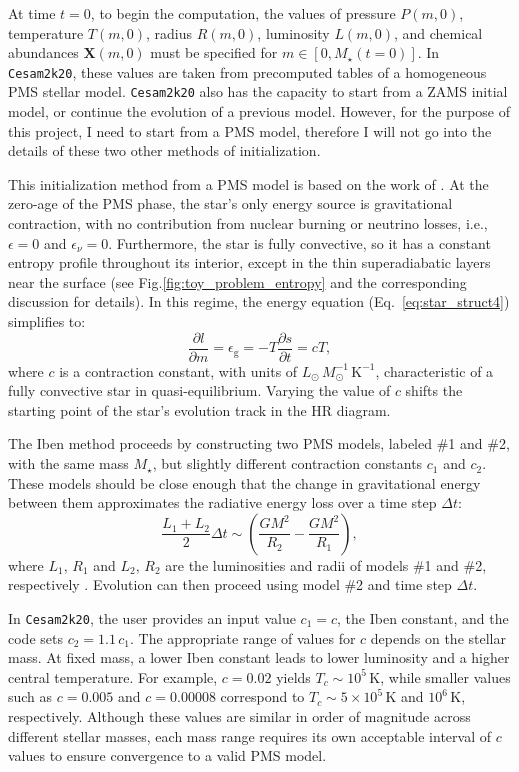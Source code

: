 \documentclass[12pt,a4paper]{article}
\newcommand{\mr}{\mathrm}
\newcommand{\pfird}[2][]{\frac{\partial#1}{\partial#2}}
\newcommand{\bvec}[1]{\boldsymbol{#1}}
\begin{document}
At time $t = 0$, to begin the computation, the values of pressure $P(m, 0)$, temperature $T(m, 0)$, radius $R(m, 0)$, luminosity $L(m, 0)$, and chemical abundances $\bvec{X}(m, 0)$ must be specified for $m \in [0, M_\star(t=0)]$. In \texttt{Cesam2k20}, these values are taken from precomputed tables of a homogeneous PMS stellar model. \texttt{Cesam2k20} also has the capacity to start from a ZAMS initial model, or continue the evolution of a previous model. However, for the purpose of this project, I need to start from a PMS model, therefore I will not go into the details of these two other methods of initialization. 

This initialization method from a PMS model is based on the work of \textcite{Iben1965a}. At the zero-age of the PMS phase, the star's only energy source is gravitational contraction, with no contribution from nuclear burning or neutrino losses, i.e., $\epsilon = 0$ and $\epsilon_\nu = 0$. Furthermore, the star is fully convective, so it has a constant entropy profile throughout its interior, except in the thin superadiabatic layers near the surface (see Fig.\ref{fig:toy_problem_entropy} and the corresponding discussion for details). In this regime, the energy equation (Eq.~\eqref{eq:star_struct4}) simplifies to:
\begin{equation}
  \pfird[l]{m} = \epsilon_\mr{g} = -T\pfird[s]{t} = cT,
\end{equation}
where $c$ is a contraction constant, with units of $L_\odot\,M_\odot^{-1}\,\mr{K}^{-1}$, characteristic of a fully convective star in quasi-equilibrium. Varying the value of $c$ shifts the starting point of the star's evolution track in the HR diagram.

The Iben method proceeds by constructing two PMS models, labeled \#1 and \#2, with the same mass $M_\star$, but slightly different contraction constants $c_1$ and $c_2$. These models should be close enough that the change in gravitational energy between them approximates the radiative energy loss over a time step $\Delta t$:
\begin{equation}
  \frac{L_1 + L_2}{2}\Delta t \sim \left(\frac{GM^2}{R_2} - \frac{GM^2}{R_1}\right),
\end{equation}
where $L_1$, $R_1$ and $L_2$, $R_2$ are the luminosities and radii of models \#1 and \#2, respectively \parencite[cf. Eq.~(13)][]{Morel1997}. Evolution can then proceed using model \#2 and time step $\Delta t$.

In \texttt{Cesam2k20}, the user provides an input value $c_1 = c$, the Iben constant, and the code sets $c_2 = 1.1\,c_1$. The appropriate range of values for $c$ depends on the stellar mass. At fixed mass, a lower Iben constant leads to lower luminosity and a higher central temperature. For example, $c = 0.02$ yields $T_c \sim 10^5\,\mr{K}$, while smaller values such as $c = 0.005$ and $c = 0.00008$ correspond to $T_c \sim 5 \times 10^5\,\mr{K}$ and $10^6\,\mr{K}$, respectively. Although these values are similar in order of magnitude across different stellar masses, each mass range requires its own acceptable interval of $c$ values to ensure convergence to a valid PMS model.
\end{document}
